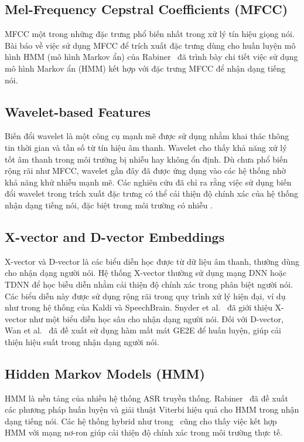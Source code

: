 \documentclass[conference]{IEEEtran}
\begin{document}
\subsection{Mel-Frequency Cepstral Coefficients (MFCC)}

MFCC một trong những đặc trưng phổ biến nhất trong xử lý tín hiệu giọng nói. Bài báo về việc sử dụng MFCC để trích xuất đặc trưng dùng cho huấn luyện mô hình HMM (mô hình Markov ẩn) của Rabiner~\cite{rabiner1989tutorial} đã trình bày chi tiết việc sử dụng mô hình Markov ẩn (HMM) kết hợp với đặc trưng MFCC để nhận dạng tiếng nói.
\subsection{Wavelet-based Features}

Biến đổi wavelet là một công cụ mạnh mẽ được sử dụng nhằm khai thác thông tin thời gian và tần số từ tín hiệu âm thanh. Wavelet cho thấy khả năng xử lý tốt âm thanh trong môi trường bị nhiễu hay không ổn định. Dù chưa phổ biến rộng rãi như MFCC, wavelet gần đây đã được ứng dụng vào các hệ thống nhờ khả năng khử nhiễu mạnh mẽ. Các nghiên cứu đã chỉ ra rằng việc sử dụng biến đổi wavelet trong trích xuất đặc trưng có thể cải thiện độ chính xác của hệ thống nhận dạng tiếng nói, đặc biệt trong môi trường có nhiễu \cite{gupta2003robust, wang2008robust}.

\subsection{X-vector and D-vector Embeddings}

X-vector và D-vector là các biểu diễn học được từ dữ liệu âm thanh, thường dùng cho nhận dạng người nói. Hệ thống X-vector thường sử dụng mạng DNN hoặc TDNN để học biễu diễn nhằm cải thiện độ chính xác trong phân biệt người nói. Các biểu diễn này được sử dụng rộng rãi trong quy trình xử lý hiện đại, ví dụ như trong hệ thống của Kaldi và SpeechBrain. Snyder et al.~\cite{Snyder2018Xvectors} đã giới thiệu X-vector như một biểu diễn học sâu cho nhận dạng người nói. Đối với D-vector, Wan et al.~\cite{Wan2018Generalized} đã đề xuất sử dụng hàm mất mát GE2E để huấn luyện, giúp cải thiện hiệu suất trong nhận dạng người nói.

\subsection{Hidden Markov Models (HMM)}

HMM là nền tảng của nhiều hệ thống ASR truyền thống. Rabiner~\cite{rabiner1989tutorial} đã đề xuất các phương pháp huấn luyện và giải thuật Viterbi hiệu quả cho HMM trong nhận dạng tiếng nói. Các hệ thống hybrid như trong~\cite{voll2007hybrid, perero2022comparison} cũng cho thấy việc kết hợp HMM với mạng nơ-ron giúp cải thiện độ chính xác trong môi trường thực tế.
\end{document}
